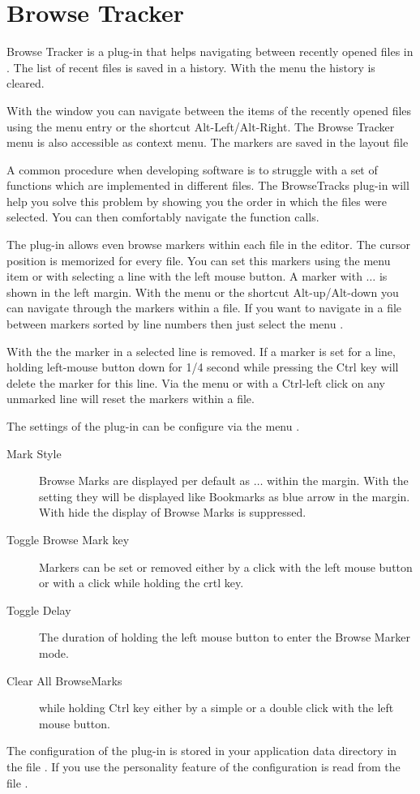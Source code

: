 \section{Browse Tracker}\label{sec:browsetracker}

Browse Tracker is a plug-in that helps navigating between recently opened files in \codeblocks. The list of recent files is saved in a history. With the menu  the history is cleared.

With the window  you can navigate between the items of the recently opened files using the menu entry  or the shortcut Alt-Left/Alt-Right. The Browse Tracker menu is also accessible as context menu. The markers are saved in the layout file 

A common procedure when developing software is to struggle with a set of functions which are implemented in different files. The BrowseTracks plug-in will help you solve this problem by showing you the order in which the files were selected. You can then comfortably navigate the function calls.

The plug-in allows even browse markers within each file in the \codeblocks editor. The cursor position is memorized for every file. You can set this markers using the menu item  or with selecting a line with the left mouse button. A marker with $\ldots$ is shown in the left margin. With the menu  or the shortcut Alt-up/Alt-down you can navigate through the markers within a file. If you want to navigate in a file between markers sorted by line numbers then just select the menu .

With the  the marker in a selected line is removed. If a marker is set for a line, holding left-mouse button down for 1/4 second while pressing the Ctrl key will delete the marker for this line. Via the menu  or with a Ctrl-left click on any unmarked line will reset the markers within a file.

The settings of the plug-in can be configure via the menu .

\begin{description}
\item[Mark Style] Browse Marks are displayed per default as $\ldots$ within the margin. With the setting  they will be displayed like Bookmarks as blue arrow in the margin. With hide the display of Browse Marks is suppressed.
\item[Toggle Browse Mark key] Markers can be set or removed either by a click with the left mouse button or with a click while holding the crtl key.
\item[Toggle Delay] The duration of holding the left mouse button to enter the Browse Marker mode.
\item[Clear All BrowseMarks] while holding Ctrl key either by a simple or a double click with the left mouse button.
\end{description}

The configuration of the plug-in is stored in your application data directory in the file . If you use the personality feature of \codeblocks the configuration is read from the file .






